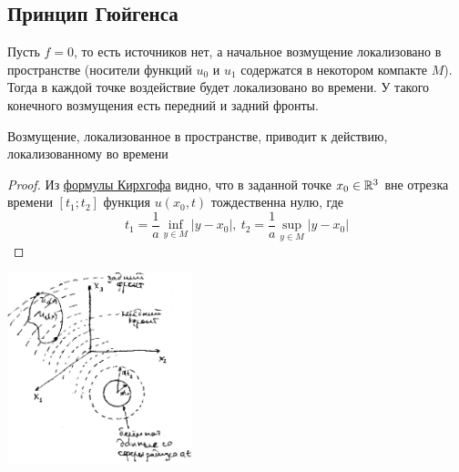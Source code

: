 \documentclass[../main.tex]{subfiles}
\begin{document}
\subsection{Принцип Гюйгенса}

Пусть $f=0$, то есть источников нет, а начальное возмущение локализовано в пространстве (носители функций $u_0$ и $u_1$ содержатся в некотором компакте $M$). Тогда в каждой точке воздействие будет локализовано во времени. У такого конечного возмущения есть передний и задний фронты. 
\begin{statement}
    Возмущение, локализованное в пространстве, приводит к действию, локализованному во времени
\end{statement}

\begin{proof}
Из \hyperref[6_4]{формулы Кирхгофа} видно, что в заданной точке $x_0 \in \mathbb{R}^3$ вне отрезка времени $[t_1; t_2]$ функция
$u(x_0, t)$ тождественна нулю, где 
$$
t_1 = \frac{1}{a}\inf_{y\in M}|y-x_0|, 
~ t_2 = \frac{1}{a} \sup_{y \in M}|y-x_0|
$$
\end{proof}

\begin{center}
    \includegraphics[width=0.4\textwidth]{6_1_new}
\end{center}
\end{document}
